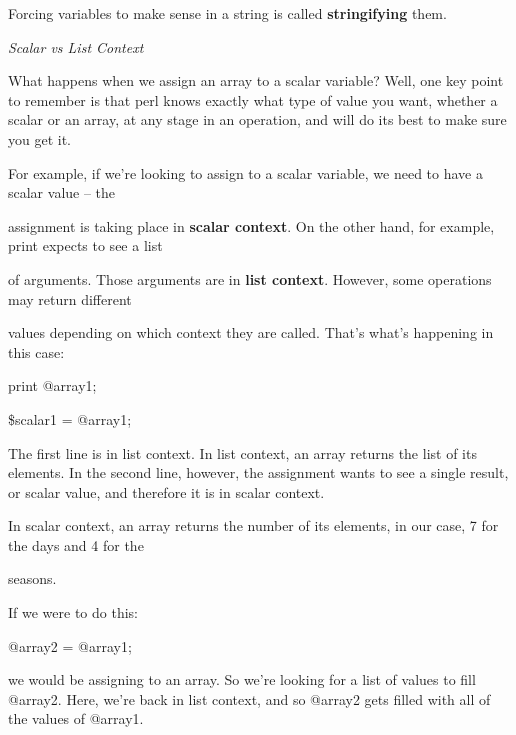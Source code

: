 \documentclass[a4paper,11pt]{book}
\begin{document}
\noindent 

\noindent Forcing variables to make sense in a string is called \textbf{stringifying }them.

\noindent 

\noindent \textit{Scalar vs List Context}

\noindent What happens when we assign an array to a scalar variable? Well, one key point to remember is that perl knows exactly what type of value you want, whether a scalar or an array, at any stage in an operation, and will do its best to make sure you get it.

\noindent 

\noindent For example, if we're looking to assign to a scalar variable, we need to have a scalar value -- the

\noindent assignment is taking place in \textbf{scalar context}. On the other hand, for example, print expects to see a list

\noindent of arguments. Those arguments are in \textbf{list context}. However, some operations may return different

\noindent values depending on which context they are called. That's what's happening in this case:

\noindent 

\noindent 

\noindent print @array1;

\noindent \$scalar1 = @array1;

\noindent 

\noindent The first line is in list context. In list context, an array returns the list of its elements. In the second line, however, the assignment wants to see a single result, or scalar value, and therefore it is in scalar context.

\noindent In scalar context, an array returns the number of its elements, in our case, 7 for the days and 4 for the

\noindent seasons.

\noindent 

\noindent 

\noindent If we were to do this:

\noindent 

\noindent 

\noindent @array2 = @array1;

\noindent 

\noindent we would be assigning to an array. So we're looking for a list of values to fill @array2. Here, we're back in list context, and so @array2 gets filled with all of the values of @array1.
\end{document}
